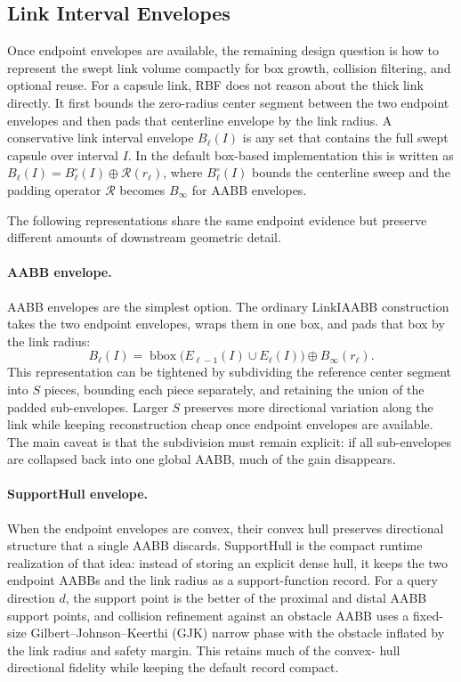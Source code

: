 \documentclass[journal]{IEEEtran}
\DeclareRobustCommand{\textsc}[1]{\textnormal{\MakeUppercase{#1}}}
\newcommand{\rbf}{\textsc{RBF}}
\begin{document}
\subsection{Link Interval Envelopes}\label{sec:rewrite_link_env}

Once endpoint envelopes are available, the remaining design question is how to
represent the swept link volume compactly for box growth, collision filtering,
and optional reuse. For a capsule link, \rbf{} does not reason about the thick link directly.
It first bounds the zero-radius center segment between the two endpoint
envelopes and then pads that centerline envelope by the link radius. A
conservative link interval envelope $B_\ell(I)$ is any set that
contains the full swept capsule over interval $I$. In the default box-based
implementation this is written as
$B_\ell(I) = B_\ell^{\circ}(I) \oplus \mathcal{R}(r_\ell)$, where
$B_\ell^{\circ}(I)$ bounds the centerline sweep and the padding operator
$\mathcal{R}$ becomes $B_\infty$ for AABB envelopes.

The following representations share the same endpoint evidence but preserve
different amounts of downstream geometric detail.

\paragraph{AABB envelope.}
AABB envelopes are the simplest option. The ordinary LinkIAABB construction
takes the two endpoint envelopes, wraps them in one box, and pads that box by
the link radius:
\[
B_\ell(I) = \operatorname{bbox}\bigl(E_{\ell-1}(I) \cup E_\ell(I)\bigr)
\oplus B_\infty(r_\ell).
\]
This representation can be tightened by subdividing the reference center
segment into $S$ pieces, bounding each piece separately, and retaining the
union of the padded sub-envelopes. Larger $S$ preserves more directional
variation along the link while keeping reconstruction cheap once endpoint
envelopes are available. The main caveat is that the subdivision must remain
explicit: if all sub-envelopes are collapsed back into one global AABB, much of
the gain disappears.


\paragraph{SupportHull envelope.}
When the endpoint envelopes are convex, their convex hull preserves directional
structure that a single AABB discards. SupportHull is the compact runtime
realization of that idea: instead of storing an explicit dense hull, it keeps
the two endpoint AABBs and the link radius as a support-function record. For a
query direction $d$, the support point is the better of the proximal and distal
AABB support points, and collision refinement against an obstacle AABB uses a
fixed-size Gilbert--Johnson--Keerthi (GJK) narrow phase with the obstacle
inflated by the link radius and safety margin. This retains much of the convex-
hull directional fidelity while keeping the default record compact.
\end{document}
